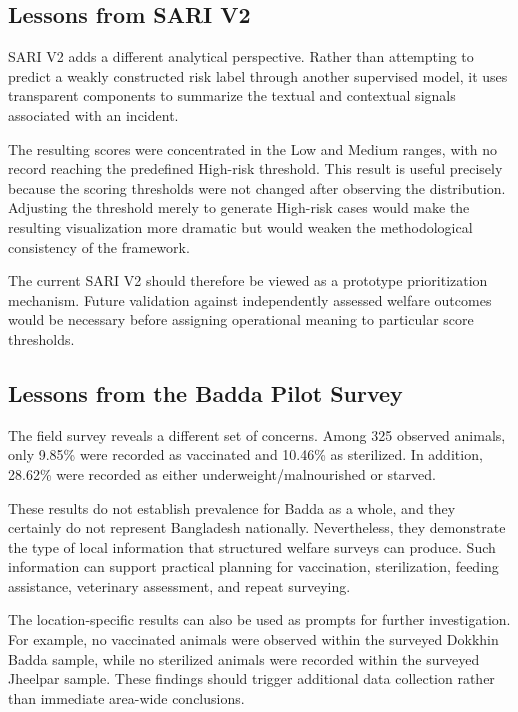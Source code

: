\documentclass[conference]{IEEEtran}
\begin{document}
\subsection{Lessons from SARI V2}

SARI V2 adds a different analytical perspective. Rather than attempting to
predict a weakly constructed risk label through another supervised model, it
uses transparent components to summarize the textual and contextual signals
associated with an incident.

The resulting scores were concentrated in the Low and Medium ranges, with no
record reaching the predefined High-risk threshold. This result is useful
precisely because the scoring thresholds were not changed after observing the
distribution. Adjusting the threshold merely to generate High-risk cases
would make the resulting visualization more dramatic but would weaken the
methodological consistency of the framework.

The current SARI V2 should therefore be viewed as a prototype prioritization
mechanism. Future validation against independently assessed welfare outcomes
would be necessary before assigning operational meaning to particular score
thresholds.

\subsection{Lessons from the Badda Pilot Survey}

The field survey reveals a different set of concerns. Among 325 observed
animals, only 9.85\% were recorded as vaccinated and 10.46\% as sterilized.
In addition, 28.62\% were recorded as either underweight/malnourished or
starved.

These results do not establish prevalence for Badda as a whole, and they
certainly do not represent Bangladesh nationally. Nevertheless, they
demonstrate the type of local information that structured welfare surveys can
produce. Such information can support practical planning for vaccination,
sterilization, feeding assistance, veterinary assessment, and repeat
surveying.

The location-specific results can also be used as prompts for further
investigation. For example, no vaccinated animals were observed within the
surveyed Dokkhin Badda sample, while no sterilized animals were recorded
within the surveyed Jheelpar sample. These findings should trigger additional
data collection rather than immediate area-wide conclusions.
\end{document}
